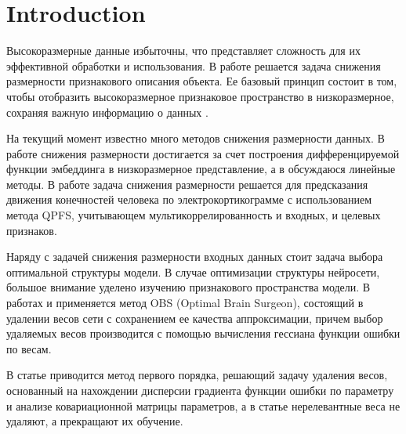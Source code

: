 \documentclass[12pt, twoside]{article}
\begin{document}


\section{Introduction}







Высокоразмерные данные избыточны, что представляет сложность для их эффективной обработки и использования. В работе решается задача снижения размерности признакового описания объекта.
Ее базовый принцип состоит в том, чтобы отобразить высокоразмерное признаковое пространство в низкоразмерное, сохраняя важную информацию о данных \citep{jia2022feature}.

На текущий момент известно много методов снижения размерности данных. В работе \citep{ornek2019nonlinear} снижения размерности достигается за счет построения дифференцируемой функции эмбеддинга в низкоразмерное представление, а в \citep{cunningham2014dimensionality} обсуждаюся линейные методы. В работе \citep{isachenko2022quadratic} задача снижения размерности решается для предсказания движения конечностей человека по электрокортикограмме с использованием  метода QPFS, учитывающем мультикоррелированность и входных, и целевых признаков.

Наряду с задачей снижения размерности входных данных стоит задача выбора оптимальной структуры модели. В случае оптимизации структуры нейросети, большое внимание уделено изучению признакового пространства модели. В работах \citep{hassibi1993optimal} и \citep{dong2017learning} применяется метод OBS (Optimal Brain Surgeon), состоящий в удалении весов сети с сохранением ее качества аппроксимации, причем выбор удаляемых весов производится с помощью вычисления гессиана функции ошибки по весам.

В статье \citep{грабовой2019определение} приводится метод первого порядка, решающий задачу удаления весов, основанный на нахождении дисперсии градиента функции ошибки по параметру и анализе ковариационной матрицы параметров, а в статье \citep{грабовой2020введение} нерелевантные веса не удаляют, а прекращают их обучение.
\end{document}

